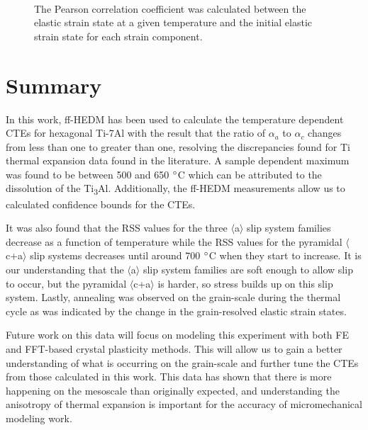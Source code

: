 \documentclass[3p]{elsarticle}
\begin{document}
	\begin{figure}[h!]
		\centering
		 \\
		\caption{The Pearson correlation coef{}ficient was calculated between the elastic strain state at a given temperature and the initial elastic strain state for each strain component.}
		\label{fig:pearson}
	\end{figure}


\section{Summary}

	In this work, f{}f-HEDM has been used to calculate the temperature dependent CTEs for hexagonal Ti-7Al with the result that the ratio of $\alpha_a$ to $\alpha_c$ changes from less than one to greater than one, resolving the discrepancies found for Ti thermal expansion data found in the literature. A sample dependent maximum was found to be between 500 and 650 $\degree$C which can be attributed to the dissolution of the Ti\textsubscript{3}Al. Additionally, the f{}f-HEDM measurements allow us to calculated confidence bounds for the CTEs. 
	
	It was also found that the RSS values for the three $\langle$a$\rangle$ slip system families decrease as a function of temperature while the RSS values for the pyramidal $\langle$c+a$\rangle$ slip systems decreases until around 700 $\degree$C when they start to increase. It is our understanding that the $\langle$a$\rangle$ slip system families are soft enough to allow slip to occur, but the pyramidal $\langle$c+a$\rangle$ is harder, so stress builds up on this slip system. Lastly, annealing was observed on the grain-scale during the thermal cycle as was indicated by the change in the grain-resolved elastic strain states.
	

	Future work on this data will focus on modeling this experiment with both FE and FFT-based crystal plasticity methods. This will allow us to gain a better understanding of what is occurring on the grain-scale and further tune the CTEs from those calculated in this work. This data has shown that there is more happening on the mesoscale than originally expected, and understanding the anisotropy of thermal expansion is important for the accuracy of micromechanical modeling work. 
	
	
\end{document}
